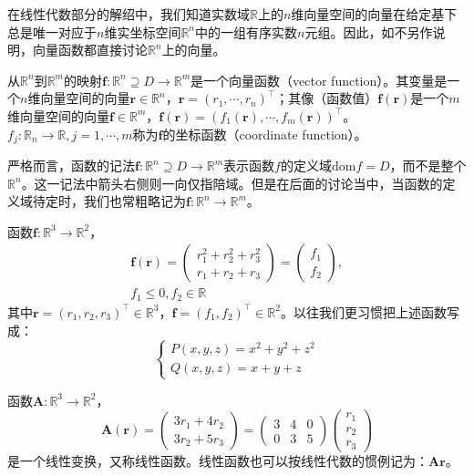\documentclass[main.tex]{subfiles}
\begin{document}
在线性代数部分的解绍中，我们知道实数域$\mathbb{R}$上的$n$维向量空间的向量在给定基下总是唯一对应于$n$维实坐标空间$\mathbb{R}^n$中的一组有序实数$n$元组。因此，如不另作说明，向量函数都直接讨论$\mathbb{R}^n$上的向量。

\begin{definition}[向量函数]
从$\mathbb{R}^n$到$\mathbb{R}^m$的映射$\mathbf{f}:\mathbb{R}^n\supseteq D\rightarrow\mathbb{R}^m$是一个向量函数（vector function）。其变量是一个$n$维向量空间的向量$\mathbf{r}\in\mathbb{R}^n$，$\mathbf{r}=\left(r_1,\cdots,r_n\right)^\intercal$；其像（函数值）$\mathbf{f}\left(\mathbf{r}\right)$是一个$m$维向量空间的向量$\mathbf{f}\in\mathbb{R}^m$，$\mathbf{f}\left(\mathbf{r}\right)=\left(f_1\left(\mathbf{r}\right),\cdots,f_m\left(\mathbf{r}\right)\right)^\intercal$。$f_j:\mathbb{R}_n\rightarrow\mathbb{R},j=1,\cdots,m$称为$\mathbf{f}$的坐标函数（coordinate function）。
\end{definition}

严格而言，函数的记法$\mathbf{f}:\mathbb{R}^n\supseteq D\rightarrow\mathbb{R}^m$表示函数$f$的定义域$\mathrm{dom}f=D$，而不是整个$\mathbb{R}^n$。这一记法中箭头右侧则一向仅指陪域。但是在后面的讨论当中，当函数的定义域待定时，我们也常粗略记为$\mathbf{f}:\mathbb{R}^n\rightarrow\mathbb{R}^m$。

\begin{example}
函数$\mathbf{f}:\mathbb{R}^3\rightarrow\mathbb{R}^2$，
\[\begin{split}\mathbf{f}\left(\mathbf{r}\right)=\left(\begin{array}{c}r_1^2+r_2^2+r_3^2\\r_1+r_2+r_3\end{array}\right)=\left(\begin{array}{c}f_1\\f_2\end{array}\right),\\f_1\leq0,f_2\in\mathbb{R}\end{split}\]
其中$\mathbf{r}=\left(r_1,r_2,r_3\right)^\intercal\in\mathbb{R}^3$，$\mathbf{f}=\left(f_1,f_2\right)^\intercal\in\mathbb{R}^2$。以往我们更习惯把上述函数写成：
\[
\left\{\begin{array}{l}
    P\left(x,y,z\right)=x^2+y^2+z^2\\
    Q\left(x,y,z\right)=x+y+z
\end{array}
\right.
\]
\end{example}

\begin{example}
函数$\mathbf{A}:\mathbb{R}^3\rightarrow\mathbb{R}^2$，
\[\mathbf{A}\left(\mathbf{r}\right)=\left(\begin{array}{c}3r_1+4r_2\\3r_2+5r_3\end{array}\right)=\left(\begin{array}{ccc}3&4&0\\0&3&5\end{array}\right)\left(\begin{array}{c}r_1\\r_2\\r_3\end{array}\right)\]
是一个线性变换，又称线性函数。线性函数也可以按线性代数的惯例记为：$\mathbf{Ar}$。
\end{example}
\end{document}
